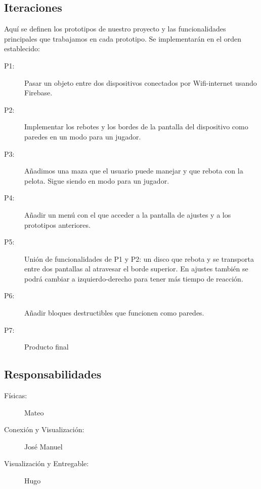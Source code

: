 \documentclass[a4paper,openright,12pt]{article}
\begin{document}
\subsection{Iteraciones}
Aquí se definen los prototipos de nuestro proyecto y las funcionalidades principales que trabajamos en cada prototipo. Se implementarán en el orden establecido:
\begin{description}
\item[P1:] Pasar un objeto entre dos dispositivos conectados por Wifi-internet usando Firebase.
\item[P2:] Implementar los rebotes y los bordes de la pantalla del dispositivo como paredes en un modo para un jugador.
\item[P3:] Añadimos una maza que el usuario puede manejar y que rebota con la pelota. Sigue siendo en modo para un jugador.
\item[P4:] Añadir un menú con el que acceder a la pantalla de ajustes y a los prototipos anteriores.
\item[P5:] Unión de funcionalidades de P1 y P2: un disco que rebota y se transporta entre dos pantallas al atravesar el borde superior. En ajustes también se podrá cambiar a izquierdo-derecho para tener más tiempo de reacción. 
\item[P6:] Añadir bloques destructibles que funcionen como paredes.
\item[P7:] Producto final
\end{description}
\subsection{Responsabilidades}
\begin{description}

\item[Físicas:] Mateo 
\item[Conexión y Visualización:] José Manuel
\item[Visualización y Entregable:] Hugo
\end{description}

\end{document}
